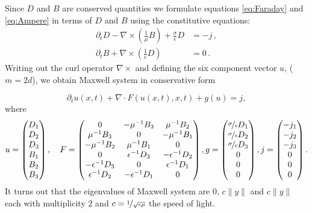 \documentclass[a4paper,12pt]{article}
\theoremstyle{definition}
\theoremstyle{definition}
\begin{document}
Since $D$ and $B$ are conserved quantities we formulate equations \eqref{eq:Faraday} and
\eqref{eq:Ampere} in terms of $D$ and $B$ using the constitutive equations:
\begin{subequations}
	\begin{align}
	\partial_t D - \nabla\times\left(\frac{1}{\mu} B\right) + \frac{\sigma}{\epsilon} D &= - j\,,  \\
	\partial_t B + \nabla\times\left( \frac{1}{\epsilon} D \right) &= 0\, .
	\end{align}
\end{subequations}
Writing out the curl operator $\nabla\times$ and defining the six component
vector $u$, ($m=2d$), we obtain Maxwell system in conservative form

$$\partial_t u(x,t) + \nabla\cdot F(u(x,t),x,t) + g(u)= j,$$
where
$$u = \begin{pmatrix}
D_1\\
D_2\\
D_3\\
B_1\\
B_2\\
B_3
\end{pmatrix} ,\quad
F= \left( \begin{matrix}
0  & -\mu^{-1}B_3 & \mu^{-1}B_2\\
\mu^{-1}B_3 & 0 & -\mu^{-1}B_1\\
-\mu^{-1}B_2 & \mu^{-1}B_1 & 0\\
0  & \epsilon^{-1}D_3 & -\epsilon^{-1}D_2\\
-\epsilon^{-1}D_3 & 0 & \epsilon^{-1}D_1\\
\epsilon^{-1}D_2 & -\epsilon^{-1}D_1 & 0\\
\end{matrix} \right),
g = \begin{pmatrix}
\nicefrac{\sigma}{\epsilon}D_1\\
\nicefrac{\sigma}{\epsilon}D_2\\
\nicefrac{\sigma}{\epsilon}D_3\\
0\\
0\\
0
\end{pmatrix},
j = \begin{pmatrix}
-j_1\\
-j_2\\
-j_3\\
0\\
0\\
0
\end{pmatrix}.
$$
It turns out that the eigenvalues 
of Maxwell system are $0$, $c\|y\|$ and $c\|y\|$ each with
multiplicity $2$ and $c=\nicefrac{1}{\sqrt{\epsilon\mu}}$ the speed of light.
\end{document}

